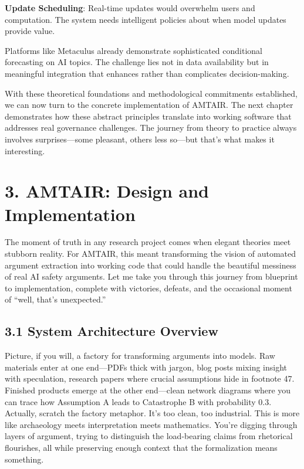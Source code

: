 \documentclass[
  11pt,
  letterpaper,
  openany]{book}
\begin{document}
\textbf{Update Scheduling}: Real-time updates would overwhelm users and
computation. The system needs intelligent policies about when model
updates provide value.

Platforms like Metaculus \textcite{tetlock2022} already demonstrate
sophisticated conditional forecasting on AI topics. The challenge lies
not in data availability but in meaningful integration that enhances
rather than complicates decision-making.

With these theoretical foundations and methodological commitments
established, we can now turn to the concrete implementation of AMTAIR.
The next chapter demonstrates how these abstract principles translate
into working software that addresses real governance challenges. The
journey from theory to practice always involves surprises---some
pleasant, others less so---but that's what makes it interesting.


\chapter{3. AMTAIR: Design and Implementation}\label{sec-amtair}

The moment of truth in any research project comes when elegant theories
meet stubborn reality. For AMTAIR, this meant transforming the vision of
automated argument extraction into working code that could handle the
beautiful messiness of real AI safety arguments. Let me take you through
this journey from blueprint to implementation, complete with victories,
defeats, and the occasional moment of ``well, that's unexpected.''

\section{3.1 System Architecture
Overview}\label{sec-system-architecture}

Picture, if you will, a factory for transforming arguments into models.
Raw materials enter at one end---PDFs thick with jargon, blog posts
mixing insight with speculation, research papers where crucial
assumptions hide in footnote 47. Finished products emerge at the other
end---clean network diagrams where you can trace how Assumption A leads
to Catastrophe B with probability 0.3. Actually, scratch the factory
metaphor. It's too clean, too industrial. This is more like archaeology
meets interpretation meets mathematics. You're digging through layers of
argument, trying to distinguish the load-bearing claims from rhetorical
flourishes, all while preserving enough context that the formalization
means something.
\end{document}
